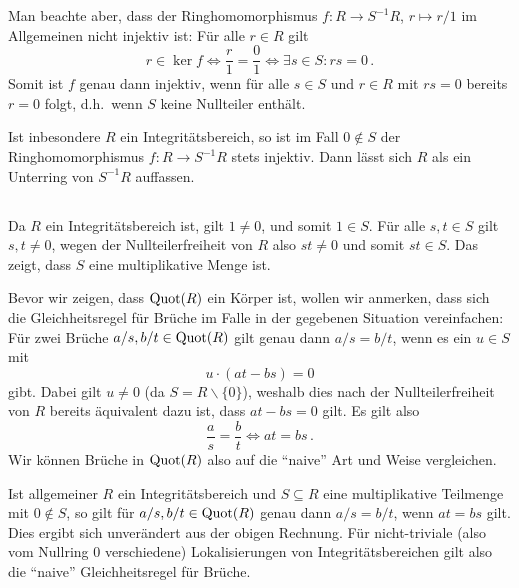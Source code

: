 \begin{remark}
  \label{remark: injectivity of the canonical map}
  Man beachte aber, dass der Ringhomomorphismus $f \colon R \to S^{-1} R$, $r \mapsto r/1$ im Allgemeinen nicht injektiv ist:
  Für alle $r \in R$ gilt
  \[
          r \in \ker f
    \iff  \frac{r}{1} = \frac{0}{1}
    \iff  \exists s \in S: rs = 0 \,.
  \]
  Somit ist $f$ genau dann injektiv, wenn für alle $s \in S$ und $r \in R$ mit $rs = 0$ bereits $r = 0$ folgt, d.h.\ wenn $S$ keine Nullteiler enthält.
  
  Ist inbesondere $R$ ein Integritätsbereich, so ist im Fall $0 \notin S$ der Ringhomomorphismus $f \colon R \to S^{-1} R$ stets injektiv.
  Dann lässt sich $R$ als ein Unterring von $S^{-1} R$ auffassen.
\end{remark}





\subsection{}

Da $R$ ein Integritätsbereich ist, gilt $1 \neq 0$, und somit $1 \in S$.
Für alle $s, t \in S$ gilt $s, t \neq 0$, wegen der Nullteilerfreiheit von $R$ also $st \neq 0$ und somit $st \in S$.
Das zeigt, dass $S$ eine multiplikative Menge ist.

Bevor wir zeigen, dass $\operatorname{Quot}(R)$ ein Körper ist, wollen wir anmerken, dass sich die Gleichheitsregel für Brüche im Falle in der gegebenen Situation vereinfachen:
Für zwei Brüche $a/s, b/t \in \operatorname{Quot}(R)$ gilt genau dann $a/s = b/t$, wenn es ein $u \in S$ mit
\[
    u \cdot (at - bs) = 0
\]
gibt.
Dabei gilt $u \neq 0$ (da $S = R \smallsetminus \{0\}$), weshalb dies nach der Nullteilerfreiheit von $R$ bereits äquivalent dazu ist, dass $at - bs = 0$ gilt.
Es gilt also
\[
    \frac{a}{s}
  = \frac{b}{t}
  \iff
    at = bs \,.
\]
Wir können Brüche in $\operatorname{Quot}(R)$ also auf die \enquote{naive} Art und Weise vergleichen.

\begin{remark}
  Ist allgemeiner $R$ ein Integritätsbereich und $S \subseteq R$ eine multiplikative Teilmenge mit $0 \notin S$, so gilt für $a/s, b/t \in \operatorname{Quot}(R)$ genau dann $a/s = b/t$, wenn $at = bs$ gilt.
  Dies ergibt sich unverändert aus der obigen Rechnung.
  Für nicht-triviale (also vom Nullring $0$ verschiedene) Lokalisierungen von Integritätsbereichen gilt also die \enquote{naive} Gleichheitsregel für Brüche.
\end{remark}

